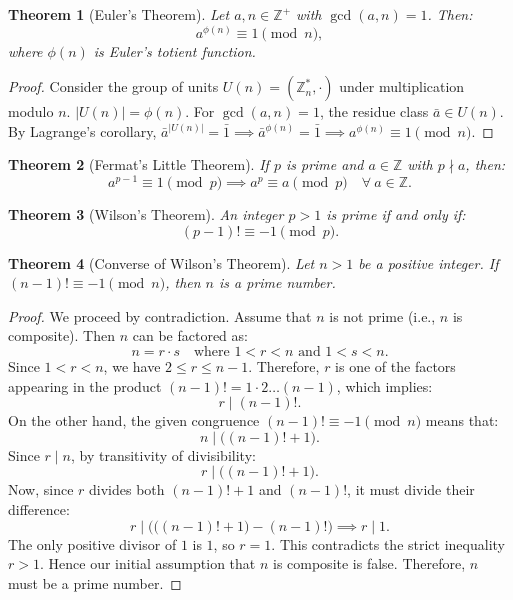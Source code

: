\documentclass[12pt]{article}
\theoremstyle{definition}
\theoremstyle{plain}
\newtheorem{theorem}{Theorem}[section]
\begin{document}
\begin{theorem}[Euler's Theorem]
Let $a, n \in \mathbb{Z}^+$ with $\gcd(a, n) = 1$. Then:
\[
a^{\phi(n)} \equiv 1 \pmod n,
\]
where $\phi(n)$ is Euler's totient function.
\end{theorem}

\begin{proof}
Consider the group of units $U(n) = (\mathbb{Z}_n^*, \cdot)$ under multiplication modulo $n$.
$|U(n)| = \phi(n)$.
For $\gcd(a, n) = 1$, the residue class $\bar{a} \in U(n)$.
By Lagrange's corollary, $\bar{a}^{|U(n)|} = \bar{1} \implies \bar{a}^{\phi(n)} = \bar{1} \implies a^{\phi(n)} \equiv 1 \pmod n$.
\end{proof}

\begin{theorem}[Fermat's Little Theorem]
If $p$ is prime and $a \in \mathbb{Z}$ with $p \nmid a$, then:
\[
a^{p-1} \equiv 1 \pmod p \implies a^p \equiv a \pmod p \quad \forall\ a \in \mathbb{Z}.
\]
\end{theorem}

\begin{theorem}[Wilson's Theorem]
An integer $p > 1$ is prime if and only if:
\[
(p - 1)! \equiv -1 \pmod p.
\]
\end{theorem}


\begin{theorem}[Converse of Wilson's Theorem]
Let $n > 1$ be a positive integer. If $(n-1)! \equiv -1 \pmod n$, then $n$ is a prime number.
\end{theorem}
\begin{proof}
We proceed by contradiction.
Assume that $n$ is not prime (i.e., $n$ is composite).
Then $n$ can be factored as:
\[
n = r \cdot s \quad \text{where } 1 < r < n \text{ and } 1 < s < n.
\]
Since $1 < r < n$, we have $2 \le r \le n - 1$.
Therefore, $r$ is one of the factors appearing in the product $(n-1)! = 1 \cdot 2 \dots (n-1)$, which implies:
\[
r \mid (n-1)!.
\]
On the other hand, the given congruence $(n-1)! \equiv -1 \pmod n$ means that:
\[
n \mid \big((n-1)! + 1\big).
\]
Since $r \mid n$, by transitivity of divisibility:
\[
r \mid \big((n-1)! + 1\big).
\]
Now, since $r$ divides both $(n-1)! + 1$ and $(n-1)!$, it must divide their difference:
\[
r \mid \Big(\big((n-1)! + 1\big) - (n-1)!\Big) \implies r \mid 1.
\]
The only positive divisor of $1$ is $1$, so $r = 1$.
This contradicts the strict inequality $r > 1$.
Hence our initial assumption that $n$ is composite is false.
Therefore, $n$ must be a prime number.
\end{proof}
\end{document}
